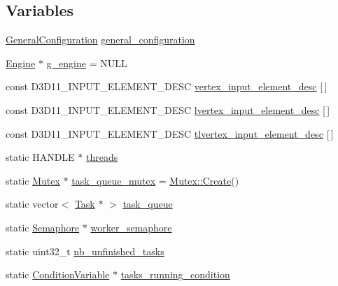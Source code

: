 \subsection*{Variables}
\begin{DoxyCompactItemize}
\item 
\hyperlink{structmage_1_1_general_configuration}{General\+Configuration} \hyperlink{namespacemage_a1f4290d574030d412ca0f2f51b1a2057}{general\+\_\+configuration}
\item 
\hyperlink{classmage_1_1_engine}{Engine} $\ast$ \hyperlink{namespacemage_a84bf83f1e8779d884452cdf08f56c19a}{g\+\_\+engine} = N\+U\+LL
\item 
const D3\+D11\+\_\+\+I\+N\+P\+U\+T\+\_\+\+E\+L\+E\+M\+E\+N\+T\+\_\+\+D\+E\+SC \hyperlink{namespacemage_a8647e0bbbbe87e5c6d7a4d4622230119}{vertex\+\_\+input\+\_\+element\+\_\+desc} \mbox{[}$\,$\mbox{]}
\item 
const D3\+D11\+\_\+\+I\+N\+P\+U\+T\+\_\+\+E\+L\+E\+M\+E\+N\+T\+\_\+\+D\+E\+SC \hyperlink{namespacemage_ae6b56f20c8e8917ef1be8d9e4cef3ea3}{lvertex\+\_\+input\+\_\+element\+\_\+desc} \mbox{[}$\,$\mbox{]}
\item 
const D3\+D11\+\_\+\+I\+N\+P\+U\+T\+\_\+\+E\+L\+E\+M\+E\+N\+T\+\_\+\+D\+E\+SC \hyperlink{namespacemage_a0f27594da3814c163fe995326acf6c5e}{tlvertex\+\_\+input\+\_\+element\+\_\+desc} \mbox{[}$\,$\mbox{]}
\item 
static H\+A\+N\+D\+LE $\ast$ \hyperlink{namespacemage_a15e9f7d36194ec1b768a82a2294cce6c}{threads}
\item 
static \hyperlink{classmage_1_1_mutex}{Mutex} $\ast$ \hyperlink{namespacemage_a7de4544ddddcf8e0d54dbfdc0778f13f}{task\+\_\+queue\+\_\+mutex} = \hyperlink{classmage_1_1_mutex_a48d784fa6bffd4088d9f89a2a9cca84e}{Mutex\+::\+Create}()
\item 
static vector$<$ \hyperlink{classmage_1_1_task}{Task} $\ast$ $>$ \hyperlink{namespacemage_af4824558d428695e4661c5e7cdfa4419}{task\+\_\+queue}
\item 
static \hyperlink{classmage_1_1_semaphore}{Semaphore} $\ast$ \hyperlink{namespacemage_a17c3448f9fba7521d188d30bdfb77e33}{worker\+\_\+semaphore}
\item 
static uint32\+\_\+t \hyperlink{namespacemage_a390e8652d67667609daf3aa64e3c00a8}{nb\+\_\+unfinished\+\_\+tasks}
\item 
static \hyperlink{classmage_1_1_condition_variable}{Condition\+Variable} $\ast$ \hyperlink{namespacemage_a8c04b4285ebbc0fb416b1905c01cf149}{tasks\+\_\+running\+\_\+condition}
\end{DoxyCompactItemize}


